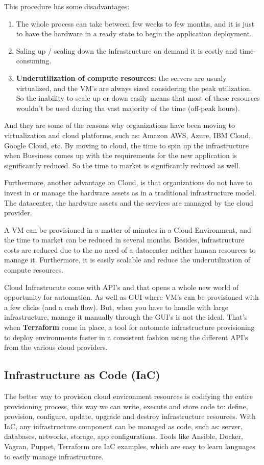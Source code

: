 \documentclass{article}
\begin{document}
This procedure has some disadvantages:
\begin{enumerate}
    \item The whole process can take between few weeks to few months, and it is just to have the hardware in a ready state to begin the application deployment.
    \item Saling up / scaling down the infrastructure on demand it is costly and time-consuming.
    \item \textbf{Underutilization of compute resources:} the servers are usualy virtualized, and the VM's are always sized considering the peak utilization. So the inability to scale up or down easily means that most of these resources wouldn't be used during tha vast majority of the time (off-peak hours).
\end{enumerate}

And they are some of the reasons why organizations have been moving  to virtualization and cloud platforms, such as: Amazon AWS, Azure, IBM Cloud, Google Cloud, etc. By moving to cloud, the time to spin up the infrastructure when Bussiness comes up with the requirements for the new application is significantly reduced. So the time to market is significantly reduced as well.

Furthermore, another advantage on Cloud, is that organizations do not have to invest in or manage the hardware assets as in a traditional infrastructure model. The datacenter, the hardware assets and the services are managed by the cloud provider.

A VM can be provisioned in a matter of minutes in a Cloud Environment, and the time to market can be reduced in several months. Besides, infrastructure costs are reduced due to the no need of a datacenter neither human resources to manage it. Furthermore, it is easily scalable and reduce the underutilization of compute resources.

Cloud Infrastrucute come with API's and that opens a whole new world of opportunity for automation. As well as GUI where VM's can be provisioned with a few clicks (and a cash flow). But, when you have to handle with large infrastructure, manage it manually through the GUI's is not the ideal. That's when \textbf{Terraform} come in place, a tool for automate infrastructure provisioning to deploy environments faster in a consistent fashion using the different API's from the various cloud providers.

\subsection{Infrastructure as Code (IaC)}
The better way to provision cloud environment resources is codifying the entire provisioning process, this way we can write, execute and store code to: define, provision, configure, update, upgrade and destroy infrastructure resources. With IaC, any infrastructure component can be managed as code, such as: server, databases, networks, storage, app configurations. Tools like Ansible, Docker, Vagran, Puppet, Terraform are IaC examples, which are easy to learn languages to easily manage infrastructure.
\end{document}
